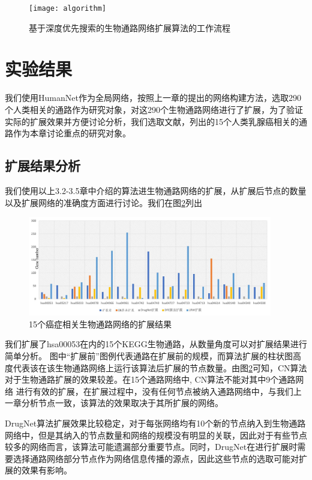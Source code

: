 \begin{figure}[h]
\centering
\texttt{[image: algorithm]}
\caption[algorithm]{基于深度优先搜索的生物通路网络扩展算法的工作流程}
\label{algorithm}
\end{figure}


 \section{实验结果}
 我们使用HumanNet作为全局网络，按照上一章的提出的网络构建方法，选取290个人类相关的通路作为研究对象，对这290个生物通路网络进行了扩展，为了验证实际的扩展效果并方便讨论分析，我们选取文献\cite{}，列出的15个人类乳腺癌相关的通路作为本章讨论重点的研究对象。
 \subsection{扩展结果分析}
 我们使用以上3.2-3.5章中介绍的算法进生物通路网络的扩展，从扩展后节点的数量以及扩展网络的准确度方面进行讨论。我们在图\ref{allexpansion}列出
 \begin{figure}[h]
\centering
\includegraphics[width = 0.95\textwidth]{allexpansion}
\caption[allexpansion]{15个癌症相关生物通路网络的扩展结果}
\label{allexpansion}
\end{figure}

我们扩展了hsa00053在内的15个KEGG\cite{}生物通路，从数量角度可以对扩展结果进行简单分析。
图中“扩展前”图例代表通路在扩展前的规模，而算法扩展的柱状图高度代表该在该生物通路网络上运行该算法后扩展的节点数量。由图\ref{allexpansion}可知，CN算法对于生物通路扩展的效果较差。在15个通路网络中, CN算法不能对其中9个通路网络
进行有效的扩展，在扩展过程中，没有任何节点被纳入通路网络中，与我们上一章分析节点一致，该算法的效果取决于其所扩展的网络。

DrugNet算法扩展效果比较稳定，对于每张网络均有10个新的节点纳入到生物通路网络中，但是其纳入的节点数量和网络的规模没有明显的关联，因此对于有些节点较多的网络而言，该算法可能遗漏部分重要节点。同时，DrugNet在进行扩展时需要选择通路网络部分节点作为网络信息传播的源点，因此这些节点的选取可能对扩展的效果有影响。


